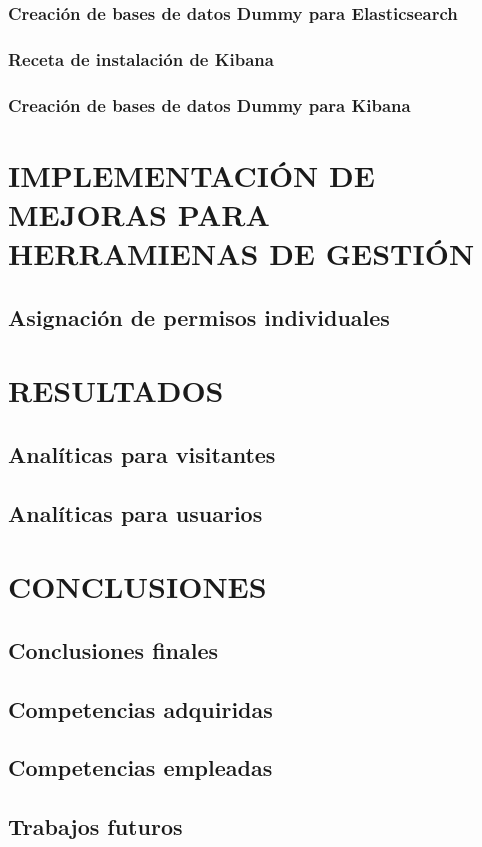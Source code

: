 \documentclass[11pt,a4paper]{book}
\begin{document}
			\subsection{Creación de bases de datos Dummy para Elasticsearch}
			\subsection{Receta de instalación de Kibana}
			\subsection{Creación de bases de datos Dummy para Kibana}
	\chapter{IMPLEMENTACIÓN DE MEJORAS PARA HERRAMIENAS DE GESTIÓN}
		\section{Asignación de permisos individuales}
	\chapter{RESULTADOS}
		\section{Analíticas para visitantes}
		\section{Analíticas para usuarios}
	\chapter{CONCLUSIONES}
		\section{Conclusiones finales}
		\section{Competencias adquiridas}
		\section{Competencias empleadas}
		\section{Trabajos futuros}
\end{document}
